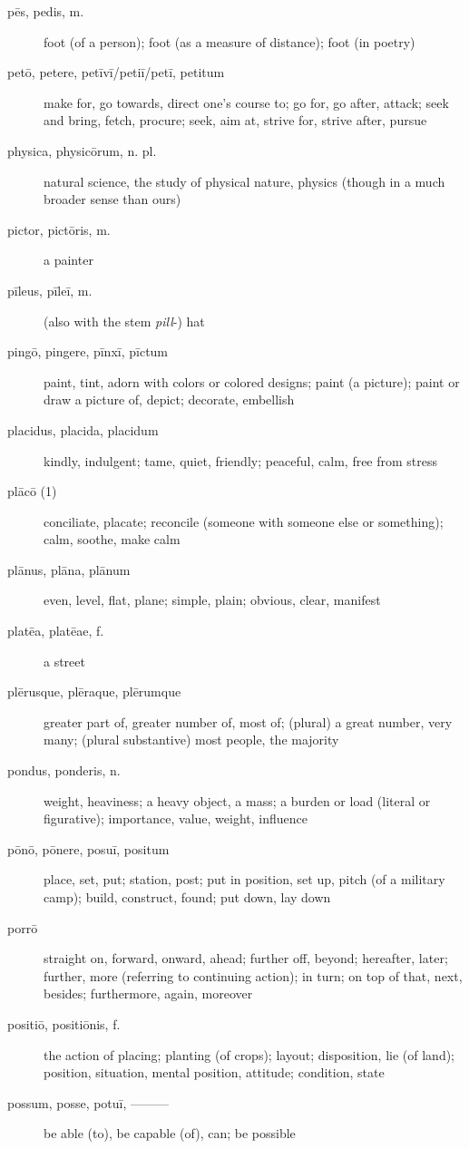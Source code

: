\begin{description}
    \item[pēs, pedis, m.] foot (of a person); foot (as a measure of distance); foot (in poetry)
    \item[petō, petere, petīvī/petiī/petī, petitum] make for, go towards, direct one's course to; go for, go after, attack; seek and bring, fetch, procure; seek, aim at, strive for, strive after, pursue
    \item[physica, physicōrum, n. pl.] natural science, the study of physical nature, physics (though in a much broader sense than ours)
    \item[pictor, pictōris, m.] a painter
    \item[pīleus, pīleī, m.] (also with the stem \textit{pill}-) hat
    \item[pingō, pingere, pīnxī, pīctum] paint, tint, adorn with colors or colored designs; paint (a picture); paint or draw a picture of, depict; decorate, embellish
    \item[placidus, placida, placidum] kindly, indulgent; tame, quiet, friendly; peaceful, calm, free from stress
    \item[plācō (1)] conciliate, placate; reconcile (someone with someone else or something); calm, soothe, make calm
    \item[plānus, plāna, plānum] even, level, flat, plane; simple, plain; obvious, clear, manifest
    \item[platēa, platēae, f.] a street
    \item[plērusque, plēraque, plērumque] greater part of, greater number of, most of; (plural) a great number, very many; (plural substantive) most people, the majority
    \item[pondus, ponderis, n.] weight, heaviness; a heavy object, a mass; a burden or load (literal or figurative); importance, value, weight, influence
    \item[pōnō, pōnere, posuī, positum] place, set, put; station, post; put in position, set up, pitch (of a military camp); build, construct, found; put down, lay down
    \item[porrō] straight on, forward, onward, ahead; further off, beyond; hereafter, later; further, more (referring to continuing action); in turn; on top of that, next, besides; furthermore, again, moreover
    \item[positiō, positiōnis, f.] the action of placing; planting (of crops); layout; disposition, lie (of land); position, situation, mental position, attitude; condition, state
    \item[possum, posse, potuī, ———] be able (to), be capable (of), can; be possible

\end{description}
